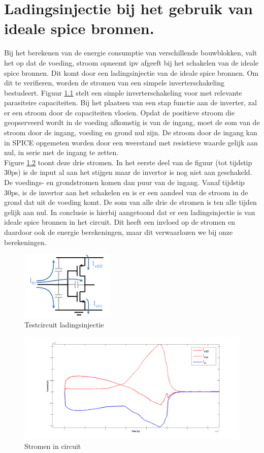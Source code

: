 \chapter{Ladingsinjectie bij het gebruik van ideale spice bronnen.}
\label{app:chargeinj}
Bij het berekenen van de energie consumptie van verschillende bouwblokken, valt het op dat de voeding, stroom opneemt ipv afgeeft bij het schakelen van de ideale spice bronnen. Dit komt door een ladingsinjectie van de ideale spice bronnen. Om dit te verifieren, worden de stromen van een simpele inverterschakeling bestudeert. Figuur \ref{fig:chargeinj_inv} stelt een simple inverterschakeling voor met relevante parasiteire capaciteiten. Bij het plaatsen van een stap functie aan de inverter, zal er een stroom door de capaciteiten vloeien. Opdat de positieve stroom die geopserveerd wordt in de voeding afkomstig is van de ingang, moet de som van de stroom door de ingang, voeding en grond nul zijn. De stroom door de ingang kan in SPICE opgemeten worden door een weerstand met resistieve waarde gelijk aan nul, in serie met de ingang te zetten.\\
Figure \ref{fig:chargeinj_cur} toont deze drie stromen. In het eerste deel van de figuur (tot tijdstip 30ps) is de input al aan het stijgen maar de invertor is nog niet aan geschakeld. De voedings- en grondstromen komen dan puur van de ingang. Vanaf tijdstip 30ps, is de invertor aan het schakelen en is er een aandeel van de stroom in de grond dat uit de voeding komt. De som van alle drie de stromen is ten alle tijden gelijk aan nul.
In conclusie is hierbij aangetoond dat er een ladingsinjectie is van ideale spice bronnen in het circuit. Dit heeft een invloed op de stromen en daardoor ook de energie berekeningen, maar dit verwaarlozen we bij onze berekeningen.

\begin{figure}[!ht]
  \centering
  \includegraphics[width=0.4\textwidth]{../fig/hfdst-chargeinj-inv.png}
  \caption[ladingsinjectie: testcircuit]{Testcircuit ladingsinjectie}
  \label{fig:chargeinj_inv}
\end{figure}

\begin{figure}[!ht]
  \centering
  \includegraphics[width=\textwidth]{../fig/hfdst-chargeinj-currents.png}
  \caption[ladingsinjectie: stroom]{Stromen in circuit}
  \label{fig:chargeinj_cur}
\end{figure}